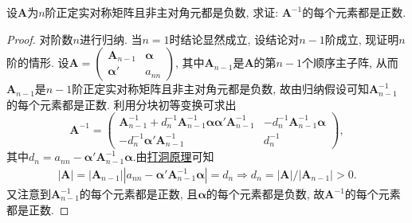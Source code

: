 \documentclass[../../main.tex]{subfiles}
\begin{document}
\begin{example}
设$\boldsymbol{A}$为$n$阶正定实对称矩阵且非主对角元都是负数, 求证: $\boldsymbol{A}^{-1}$的每个元素都是正数.
\end{example}
\begin{proof}
对阶数$n$进行归纳. 当$n = 1$时结论显然成立, 设结论对$n - 1$阶成立, 现证明$n$阶的情形. 设$\boldsymbol{A}=\begin{pmatrix}
\boldsymbol{A}_{n - 1} & \boldsymbol{\alpha} \\
\boldsymbol{\alpha}' & a_{nn}
\end{pmatrix}$, 其中$\boldsymbol{A}_{n - 1}$是$\boldsymbol{A}$的第$n - 1$个顺序主子阵, 从而$\boldsymbol{A}_{n - 1}$是$n - 1$阶正定实对称矩阵且非主对角元都是负数, 故由归纳假设可知$\boldsymbol{A}_{n - 1}^{-1}$的每个元素都是正数. 利用分块初等变换可求出
\[
\boldsymbol{A}^{-1}=\begin{pmatrix}
\boldsymbol{A}_{n - 1}^{-1}+d_n^{-1}\boldsymbol{A}_{n - 1}^{-1}\boldsymbol{\alpha}\boldsymbol{\alpha}'\boldsymbol{A}_{n - 1}^{-1} & -d_n^{-1}\boldsymbol{A}_{n - 1}^{-1}\boldsymbol{\alpha} \\
-d_n^{-1}\boldsymbol{\alpha}'\boldsymbol{A}_{n - 1}^{-1} & d_n^{-1}
\end{pmatrix},
\]
其中$d_n = a_{nn}-\boldsymbol{\alpha}'\boldsymbol{A}_{n - 1}^{-1}\boldsymbol{\alpha}$.由\hyperref[proposition:打洞原理]{打洞原理}可知
\begin{align*}
|\boldsymbol{A}|=\left| \boldsymbol{A}_{n-1} \right|\left| a_{nn}-\boldsymbol{\alpha }\prime \boldsymbol{A}_{n-1}^{-1}\boldsymbol{\alpha } \right|=d_n\Rightarrow d_n=|\boldsymbol{A}|/|\boldsymbol{A}_{n-1}|>0.
\end{align*}
又注意到$\boldsymbol{A}_{n - 1}^{-1}$的每个元素都是正数, 且$\boldsymbol{\alpha}$的每个元素都是负数, 故$\boldsymbol{A}^{-1}$的每个元素都是正数. 
\end{proof}
\end{document}
